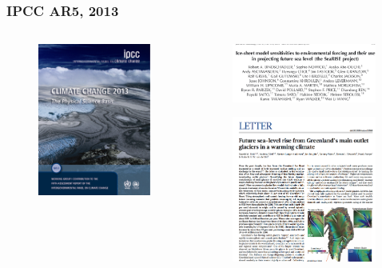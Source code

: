 \documentclass[hide notes,intlimits]{beamer}
\begin{document}
\begin{frame}
  \frametitle{IPCC AR5, 2013}
  \begin{columns}[c]
    \begin{column}{.4\linewidth}
      \begin{figure}
        \includegraphics[height=5cm]{ar5-wg1}
      \end{figure}
    \end{column}
    \begin{column}{.6\linewidth}
      \begin{figure}
        \includegraphics[width=4.75cm]{searise}
      \end{figure}
      \begin{figure}
        \includegraphics[width=4.75cm]{nick2013}
      \end{figure}
    \end{column}
  \end{columns}
\end{frame}
\end{document}
